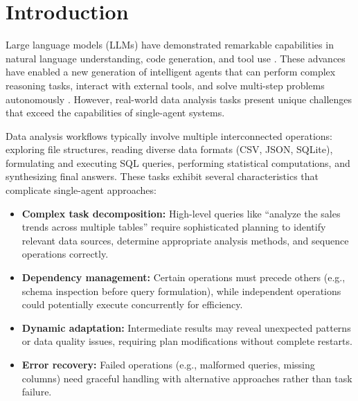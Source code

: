 \documentclass{article}
\theoremstyle{definition}
\begin{document}

\section{Introduction}

Large language models (LLMs) have demonstrated remarkable capabilities in 
natural language understanding, code generation, and tool use 
\cite{brown2020language,touvron2023llama}. 
These advances have enabled a new generation of 
intelligent agents that can perform complex reasoning tasks, 
interact with external tools, and solve multi-step problems autonomously 
\cite{yao2022react,schick2023toolformer,patil2024gorilla}. 
However, real-world data analysis tasks present unique challenges
 that exceed the capabilities of single-agent systems.

Data analysis workflows typically involve multiple interconnected operations: exploring file structures, reading diverse data formats (CSV, JSON, SQLite), formulating and executing SQL queries, performing statistical computations, and synthesizing final answers. These tasks exhibit several characteristics that complicate single-agent approaches:

\begin{itemize}[leftmargin=*, align=left]
    \item \textbf{Complex task decomposition:} High-level queries like ``analyze the sales trends across multiple tables'' require sophisticated planning to identify relevant data sources, determine appropriate analysis methods, and sequence operations correctly.
    \item \textbf{Dependency management:} Certain operations must precede others (e.g., schema inspection before query formulation), while independent operations could potentially execute concurrently for efficiency.
    \item \textbf{Dynamic adaptation:} Intermediate results may reveal unexpected patterns or data quality issues, requiring plan modifications without complete restarts.
    \item \textbf{Error recovery:} Failed operations (e.g., malformed queries, missing columns) need graceful handling with alternative approaches rather than task failure.
\end{itemize}
\end{document}
